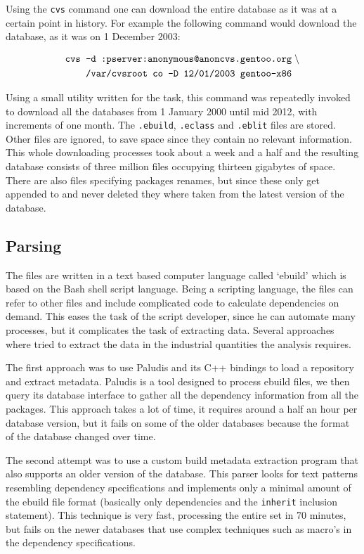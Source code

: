 \documentclass[smallextended,final]{svjour3}
\begin{document}
Using the \verb|cvs| command one can download the entire database as it was at a certain point in history. For example the following command would download the database, as it was on 1 December 2003:

\begin{align}
\mbox{\texttt{cvs -d :pserver:anonymous@anoncvs.gentoo.org}}&\;\backslash \notag\\
\mbox{\texttt{  /var/cvsroot co -D 12/01/2003 gentoo-x86}}
\label{cmd:cvs}
\end{align}

Using a small utility written for the task, this command was repeatedly invoked to download all the databases from 1 January 2000 until mid 2012, with increments of one month. The \verb|.ebuild|, \verb|.eclass| and \verb|.eblit| files are stored. Other files are ignored, to save space since they contain no relevant information. This whole downloading processes took about a week and a half and the resulting database consists of three million files occupying thirteen gigabytes of space. There are also files specifying packages renames, but since these only get appended to and never deleted they where taken from the latest version of the database.

\subsection{Parsing}

The files are written in a text based computer language called `ebuild' which is based on the Bash shell script language. Being a scripting language, the files can refer to other files and include complicated code to calculate dependencies on demand. This eases the task of the script developer, since he can automate many processes, but it complicates the task of extracting data. Several approaches where tried to extract the data in the industrial quantities the analysis requires.

The first approach was to use Paludis and its C++ bindings to load a repository and extract metadata. Paludis is a tool designed to process ebuild files, we then query its database interface to gather all the dependency information from all the packages. This approach takes a lot of time, it requires around a half an hour per database version, but it fails on some of the older databases because the format of the database changed over time.

The second attempt was to use a custom build metadata extraction program that also supports an older version of the database. This parser looks for text patterns resembling dependency specifications and implements only a minimal amount of the ebuild file format (basically only dependencies and the \verb|inherit| inclusion statement). This technique is very fast, processing the entire set in 70 minutes, but fails on the newer databases that use complex techniques such as macro's in the dependency specifications.
\end{document}
